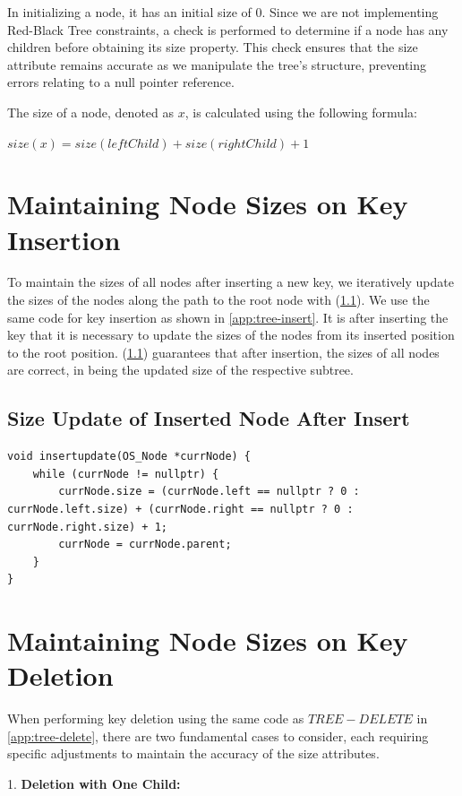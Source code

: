 \documentclass[a4paper,twoside,12pt]{report}
\begin{document}
In initializing a node, it has an initial size of 0. Since we are not implementing Red-Black Tree constraints, a check is performed to determine if a node has any children before obtaining its size property. This check ensures that the size attribute remains accurate as we manipulate the tree's structure, preventing errors relating to a null pointer reference.

The size of a node, denoted as $x$, is calculated using the following formula:

$size(x)=size(leftChild)+size(rightChild)+1$

\section{Maintaining Node Sizes on Key Insertion}
To maintain the sizes of all nodes after inserting a new key, we iteratively update the sizes of the nodes along the path to the root node with (\ref{insertUpdate}). We use the same code for key insertion as shown in \ref{app:tree-insert}. It is after inserting the key that it is necessary to update the sizes of the nodes from its inserted position to the root position. (\ref{insertUpdate}) guarantees that after insertion, the sizes of all nodes are correct, in being the updated size of the respective subtree.

\newpage
\subsection{Size Update of Inserted Node After Insert} \label{insertUpdate}
\begin{lstlisting}[style=mystyle]
void insertupdate(OS_Node *currNode) {
	while (currNode != nullptr) {
		currNode.size = (currNode.left == nullptr ? 0 : currNode.left.size) + (currNode.right == nullptr ? 0 : currNode.right.size) + 1;
		currNode = currNode.parent;
	}
}
\end{lstlisting}

\section{Maintaining Node Sizes on Key Deletion}

When performing key deletion using the same code as $TREE-DELETE$ in \ref{app:tree-delete}, there are two fundamental cases to consider, each requiring specific adjustments to maintain the accuracy of the size attributes.

1. \textbf{Deletion with One Child:}
\end{document}
